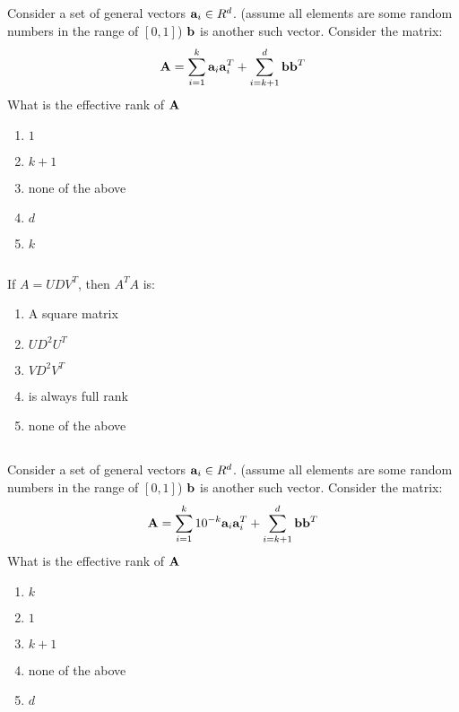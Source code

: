 \begin{frame}
\section{}
  Consider a set of general vectors ${\bf a}_i\in R^d$. (assume all elements are some random numbers in the range of $[0,1]$)
  ${\bf b}$ is another such vector. Consider the matrix:
     \[ {\bf A} = \sum_{i=1}^k {\bf a}_i {\bf a}_i^T + \sum_{i=k+1}^d {\bf b}{\bf b}^T\]
   What is the effective rank of ${\bf A}$
 
\begin{enumerate}[label=(\Alph*)]
\item $1$
\item $k+1$
\item none of the above
\item $d$
\item $k$ 
\end{enumerate}
\end{frame}

\begin{frame}
\section{}
   If $A=UDV^T$, then $A^TA$ is:
 
\begin{enumerate}[label=(\Alph*)]
\item A square matrix
\item $UD^2U^T$
\item $VD^2V^T$
\item is always full rank
\item none of the above 
\end{enumerate}
\end{frame}

\begin{frame}
\section{}
  Consider a set of general vectors ${\bf a}_i\in R^d$. (assume all elements are some random numbers in the range of $[0,1]$)
  ${\bf b}$ is another such vector. Consider the matrix:
  \[ {\bf A} = \sum_{i=1}^k 10^{-k} {\bf a}_i {\bf a}_i^T + \sum_{i=k+1}^d {\bf b}{\bf b}^T\]
  What is the effective rank of ${\bf A}$
 
\begin{enumerate}[label=(\Alph*)]
\item $k$
\item $1$
\item $k+1$
\item none of the above
\item $d$ 
\end{enumerate}
\end{frame}

